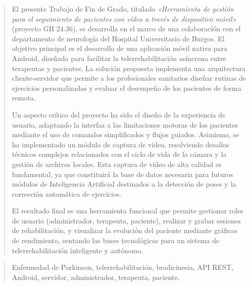 \documentclass[a4paper,12pt,twoside]{memoir}
\begin{document}
\newpage\null\thispagestyle{empty}\newpage




\frontmatter
\renewcommand*\abstractname{Resumen}
\begin{abstract}
El presente Trabajo de Fin de Grado, titulado \textit{«Herramienta de gestión para el seguimiento de pacientes con vídeo a través de dispositivo móvil»} (proyecto GII 24.36), se desarrolla en el marco de una colaboración con el departamento de neurología del Hospital Universitario de Burgos. El objetivo principal es el desarrollo de una aplicación móvil nativa para Android, diseñada para facilitar la telerrehabilitación asíncrona entre terapeutas y pacientes. La solución propuesta implementa una arquitectura cliente-servidor que permite a los profesionales sanitarios diseñar rutinas de ejercicios personalizadas y evaluar el desempeño de los pacientes de forma remota.

Un aspecto crítico del proyecto ha sido el diseño de la experiencia de usuario, adaptando la interfaz a las limitaciones motoras de los pacientes mediante el uso de comandos simplificados y flujos guiados. Asimismo, se ha implementado un módulo de captura de vídeo, resolviendo desafíos técnicos complejos relacionados con el ciclo de vida de la cámara y la gestión de archivos locales. Esta captura de vídeo de alta calidad es fundamental, ya que constituirá la base de datos necesaria para futuros módulos de Inteligencia Artificial destinados a la detección de poses y la corrección automática de ejercicios.

El resultado final es una herramienta funcional que permite gestionar roles de usuario (administrador, terapeuta, paciente), realizar y grabar sesiones de rehabilitación, y visualizar la evolución del paciente mediante gráficas de rendimiento, sentando las bases tecnológicas para un sistema de telerrehabilitación inteligente y autónomo.
\end{abstract}

\renewcommand*\abstractname{Descriptores}
\begin{abstract}
Enfermedad de Parkinson, telerrehabilitación, bradicinesia, API REST, Android, servidor, administrador, terapeuta, paciente.
\end{abstract}

\clearpage
\end{document}
